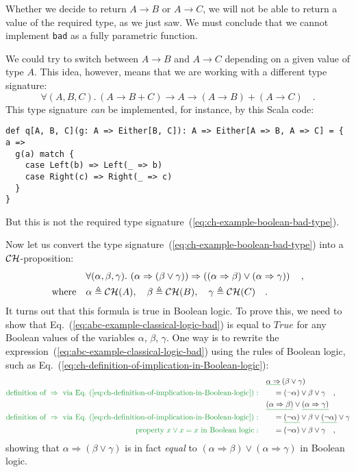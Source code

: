 Whether we decide to return $A\rightarrow B$ or $A\rightarrow C$,
we will not be able to return a value of the required type, as we
just saw. We must conclude that we cannot implement \lstinline!bad!
as a fully parametric function.

We could try to switch between $A\rightarrow B$ and $A\rightarrow C$
depending on a given value of type $A$. This idea, however, means
that we are working with a different type signature: 
\[
\forall(A,B,C).\,\left(A\rightarrow B+C\right)\rightarrow A\rightarrow\left(A\rightarrow B\right)+\left(A\rightarrow C\right)\quad.
\]
This type signature \emph{can} be implemented, for instance, by this
Scala code:
\begin{lstlisting}
def q[A, B, C](g: A => Either[B, C]): A => Either[A => B, A => C] = { a =>
  g(a) match {
    case Left(b) => Left(_ => b)
    case Right(c) => Right(_ => c)
  }
}
\end{lstlisting}
But this is not the required type signature~(\ref{eq:ch-example-boolean-bad-type}).

Now let us convert the type signature~(\ref{eq:ch-example-boolean-bad-type})
into a ${\cal CH}$-proposition:
\begin{align}
 & \forall(\alpha,\beta,\gamma).\,\left(\alpha\Rightarrow\left(\beta\vee\gamma\right)\right)\Rightarrow\left(\left(\alpha\Rightarrow\beta\right)\vee\left(\alpha\Rightarrow\gamma\right)\right)\quad,\label{eq:abc-example-classical-logic-bad}\\
\text{where}\quad & \alpha\triangleq{\cal CH}(A),\quad\beta\triangleq{\cal CH}(B),\quad\gamma\triangleq{\cal CH}(C)\quad.\nonumber 
\end{align}
It turns out that this formula is true in Boolean logic. To prove
this, we need to show that Eq.~(\ref{eq:abc-example-classical-logic-bad})
is equal to $True$ for any Boolean values of the variables $\alpha$,
$\beta$, $\gamma$. One way is to rewrite the expression~(\ref{eq:abc-example-classical-logic-bad})
using the rules of Boolean logic, such as Eq.~(\ref{eq:ch-definition-of-implication-in-Boolean-logic}):
\begin{align*}
 & \gunderline{\alpha\Rightarrow}\left(\beta\vee\gamma\right)\\
{\color{greenunder}\text{definition of }\Rightarrow\text{ via Eq.~(\ref{eq:ch-definition-of-implication-in-Boolean-logic})}:}\quad & \quad=(\neg\alpha)\vee\beta\vee\gamma\quad,\\
 & \gunderline{\left(\alpha\Rightarrow\beta\right)}\vee\gunderline{\left(\alpha\Rightarrow\gamma\right)}\\
{\color{greenunder}\text{definition of }\Rightarrow\text{ via Eq.~(\ref{eq:ch-definition-of-implication-in-Boolean-logic})}:}\quad & \quad=\gunderline{(\neg\alpha)}\vee\beta\vee\gunderline{(\neg\alpha)}\vee\gamma\\
{\color{greenunder}\text{property }x\vee x=x\text{ in Boolean logic}:}\quad & \quad=(\neg\alpha)\vee\beta\vee\gamma\quad,
\end{align*}
showing that $\alpha\Rightarrow(\beta\vee\gamma)$ is in fact \emph{equal}
to $\left(\alpha\Rightarrow\beta\right)\vee\left(\alpha\Rightarrow\gamma\right)$
in Boolean logic.

